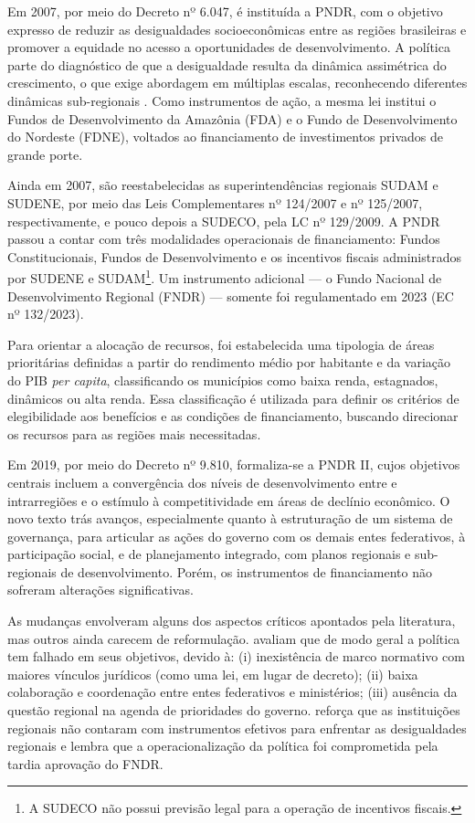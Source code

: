 Em 2007, por meio do Decreto nº 6.047, é instituída a PNDR, com o objetivo expresso de reduzir as desigualdades socioeconômicas entre as regiões brasileiras e promover a equidade no acesso a oportunidades de desenvolvimento. A política parte do diagnóstico de que a desigualdade resulta da dinâmica assimétrica do crescimento, o que exige abordagem em múltiplas escalas, reconhecendo diferentes dinâmicas sub-regionais \cite{Brasil2006}. Como instrumentos de ação, a mesma lei institui o Fundos de Desenvolvimento da Amazônia (FDA) e o Fundo de Desenvolvimento do Nordeste (FDNE), voltados ao financiamento de investimentos privados de grande porte.

Ainda em 2007, são reestabelecidas as superintendências regionais SUDAM e SUDENE, por meio das Leis Complementares nº 124/2007 e nº 125/2007, respectivamente, e pouco depois a SUDECO, pela LC nº 129/2009. A PNDR passou a contar com três modalidades operacionais de financiamento: Fundos Constitucionais, Fundos de Desenvolvimento e os incentivos fiscais administrados por SUDENE e SUDAM\footnote{A SUDECO não possui previsão legal para a operação de incentivos fiscais.}. Um instrumento adicional --- o Fundo Nacional de Desenvolvimento Regional (FNDR) --- somente foi regulamentado em 2023 (EC nº 132/2023).

Para orientar a alocação de recursos, foi estabelecida uma tipologia de áreas prioritárias definidas a partir do rendimento médio por habitante e da variação do PIB \textit{per capita}, classificando os municípios como baixa renda, estagnados, dinâmicos ou alta renda. Essa classificação é utilizada para definir os critérios de elegibilidade aos benefícios e as condições de financiamento, buscando direcionar os recursos para as regiões mais necessitadas.

Em 2019, por meio do Decreto nº 9.810, formaliza-se a PNDR II, cujos objetivos centrais incluem a convergência dos níveis de desenvolvimento entre e intrarregiões e o estímulo à competitividade em áreas de declínio econômico. O novo texto trás avanços, especialmente quanto à estruturação de um sistema de governança, para articular as ações do governo com os demais entes federativos, à participação social, e de planejamento integrado, com planos regionais e sub-regionais de desenvolvimento. Porém, os instrumentos de financiamento não sofreram alterações significativas.

As mudanças envolveram alguns dos aspectos críticos apontados pela literatura, mas outros ainda carecem de reformulação.  avaliam que de modo geral a política tem falhado em seus objetivos, devido à: (i) inexistência de marco normativo com maiores vínculos jurídicos (como uma lei, em lugar de decreto); (ii) baixa colaboração e coordenação entre entes federativos e ministérios; (iii) ausência da questão regional na agenda de prioridades do governo.  reforça que as instituições regionais não contaram com instrumentos efetivos para enfrentar as desigualdades regionais e lembra que a operacionalização da política foi comprometida pela tardia aprovação do FNDR.

